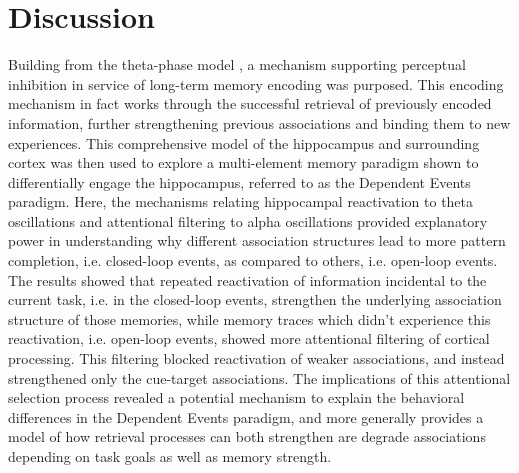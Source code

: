 \documentclass[11pt, titlepage, twoside]{article}
\begin{document}
\section{Discussion}\label{sec:discussion}

Building from the theta-phase model \cite{KetzMorkondaOReilly13}, a mechanism supporting perceptual inhibition in service of long-term memory encoding was purposed.  This encoding mechanism in fact works through the successful retrieval of previously encoded information, further strengthening previous associations and binding them to new experiences. This comprehensive model of the hippocampus and surrounding cortex was then used to explore a multi-element memory paradigm shown to differentially engage the hippocampus, referred to as the Dependent Events paradigm.   Here, the mechanisms relating hippocampal reactivation to theta oscillations and attentional filtering to alpha oscillations provided explanatory power in understanding why different association structures lead to more pattern completion, i.e. closed-loop events, as compared to others, i.e. open-loop events. The results showed that repeated reactivation of information incidental to the current task, i.e. in the closed-loop events, strengthen the underlying association structure of those memories, while memory traces which didn't experience this reactivation, i.e.  open-loop events, showed more attentional filtering of cortical processing.  This filtering blocked reactivation of weaker associations, and instead strengthened only the cue-target associations.  The implications of this attentional selection process revealed a potential mechanism to explain the behavioral differences in the Dependent Events paradigm, and more generally provides a model of how retrieval processes can both strengthen are degrade associations depending on task goals as well as memory strength.
\end{document}
